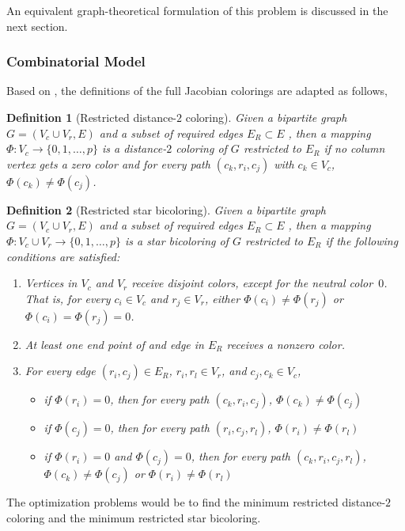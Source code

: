 \documentclass[11pt, twoside,a4paper]{book}
\newtheorem{definition}{Definition}
\begin{document}
An equivalent graph-theoretical formulation of this problem is discussed in the next
section.

\subsubsection{Combinatorial Model}
Based on \cite{Gebremedhin05whatcolor,Lulfesmann2012Fap}, the definitions
of the full Jacobian colorings are adapted as follows,
\begin{definition}[Restricted distance-$2$ coloring]\label{d.coloring.d2}
Given a bipartite graph $G=(V_c\cup V_r, E)$ and a subset of required edges
$E_R\subset E$ , then a mapping $\Phi:V_c \to
\{0,1,\dots ,p\}$ is a distance-$2$ coloring
of $G$ restricted to $E_R$ if no column vertex gets a zero color and
for every path $(c_k,r_i,c_j)$ with $c_k\in V_c$,
$\Phi(c_k) \neq \Phi(c_j)$.
\end{definition}
\begin{definition}[Restricted star bicoloring]\label{d.coloring.bicol}
Given a bipartite graph $G=(V_c\cup V_r, E)$ and a subset of required edges
$E_R\subset E$ , then a mapping $\Phi:V_c \cup V_r \to
\{0,1,\dots ,p\}$ is a star bicoloring of $G$ restricted to $E_R$
if the following conditions are satisfied:
\begin{enumerate}
\item Vertices in $V_c$ and $V_r$ receive disjoint colors, except for the neutral color~$0$. That
is, for every $c_i \in V_c$ and $r_j \in V_r$, either $\Phi(c_i) \neq \Phi(r_j)$ or
$\Phi(c_i)=\Phi(r_j)=0$.

\item At least one end point of and edge in $E_R$ receives a nonzero color.
\item For every edge $(r_i,c_j)\in E_R$, $r_i, r_l\in V_r$, and
$c_j, c_k\in V_c$,
\begin{itemize}
\item if $\Phi (r_i) = 0$, then for every path $(c_k,r_i,c_j)$, $\Phi (c_k)\neq \Phi (c_j)$
\item if $\Phi (c_j) = 0$, then for every path $(r_i,c_j,r_l)$, $\Phi (r_i)\neq \Phi (r_l)$
\item if $\Phi (r_i) = 0$ and $\Phi (c_j) = 0$, then for every path $(c_k,r_i,c_j,r_l)$,
$\Phi (c_k)\neq \Phi (c_j)$ or $\Phi (r_i)\neq \Phi (r_l)$
\end{itemize}
\end{enumerate}
\end{definition}

The optimization problems would be to
find the minimum restricted distance-$2$ coloring
and the minimum restricted star bicoloring.
\end{document}
